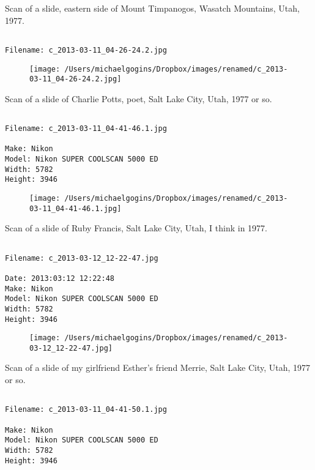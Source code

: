 \clearpage
\onecolumn
\noindent Scan of a slide, eastern side of Mount Timpanogos, Wasatch Mountains, Utah, 1977.
\noindent
\begin{lstlisting}

Filename: c_2013-03-11_04-26-24.2.jpg

\end{lstlisting}
\clearpage

\begin{figure}
\texttt{[image: /Users/michaelgogins/Dropbox/images/renamed/c\_2013-03-11\_04-26-24.2.jpg]}
\end{figure}
    
\clearpage
\onecolumn
\noindent Scan of a slide of Charlie Potts, poet, Salt Lake City, Utah, 1977 or so.
\noindent
\begin{lstlisting}

Filename: c_2013-03-11_04-41-46.1.jpg

Make: Nikon
Model: Nikon SUPER COOLSCAN 5000 ED
Width: 5782
Height: 3946
\end{lstlisting}
\clearpage

\begin{figure}
\texttt{[image: /Users/michaelgogins/Dropbox/images/renamed/c\_2013-03-11\_04-41-46.1.jpg]}
\end{figure}
    
\clearpage
\onecolumn
\noindent Scan of a slide of Ruby Francis, Salt Lake City, Utah, I think in 1977.
\noindent
\begin{lstlisting}

Filename: c_2013-03-12_12-22-47.jpg

Date: 2013:03:12 12:22:48
Make: Nikon
Model: Nikon SUPER COOLSCAN 5000 ED
Width: 5782
Height: 3946
\end{lstlisting}
\clearpage

\begin{figure}
\texttt{[image: /Users/michaelgogins/Dropbox/images/renamed/c\_2013-03-12\_12-22-47.jpg]}
\end{figure}
    
\clearpage
\onecolumn
\noindent Scan of a slide of my girlfriend Esther's friend Merrie, Salt Lake City, Utah, 1977 or so.
\noindent
\begin{lstlisting}

Filename: c_2013-03-11_04-41-50.1.jpg

Make: Nikon
Model: Nikon SUPER COOLSCAN 5000 ED
Width: 5782
Height: 3946
\end{lstlisting}
\clearpage

